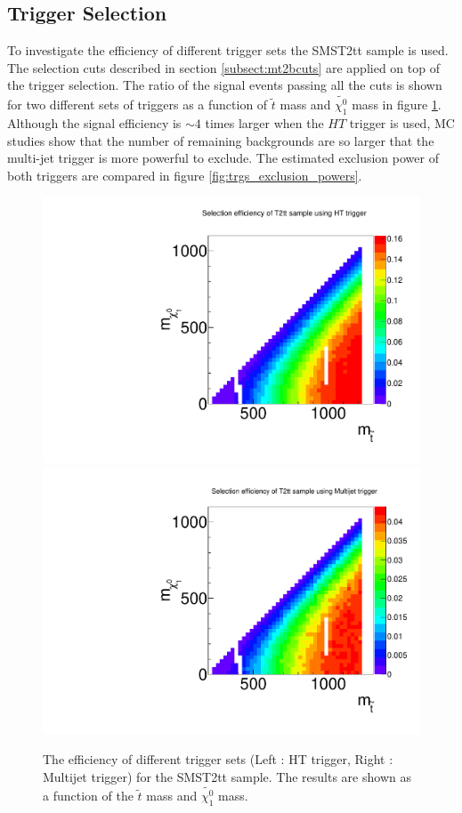 \subsection{Trigger Selection}
\label{sect:triggerselection}
To investigate the efficiency of different trigger sets the SMST2tt sample is used. The selection cuts described in section \ref{subsect:mt2bcuts} are applied on top of the trigger selection. The ratio of the signal events passing all the cuts is shown for two different sets of triggers as a function of $\tilde{t}$ mass and $\tilde{\chi^0_1}$ mass in figure \ref{fig:trg_eff}. Although the signal efficiency is $\sim 4$ times larger when the $HT$ trigger is used, MC studies show that the number of remaining backgrounds are so larger that the multi-jet trigger is more powerful to exclude. The estimated exclusion power of both triggers are compared in figure \ref{fig:trgs_exclusion_powers}.

\begin{figure}[htbp] 
\centering
\includegraphics[angle=0,scale=0.39]{figs/HT_eff.pdf}
\includegraphics[angle=0,scale=0.39]{figs/multijet_eff.pdf} \\
\caption{The efficiency of different trigger sets (Left : HT trigger, Right : Multijet trigger) for the SMST2tt sample. The results are shown as a function of the $\tilde{t}$ mass and $\tilde{\chi^0_1}$ mass.}
\label{fig:trg_eff}
\end{figure}

